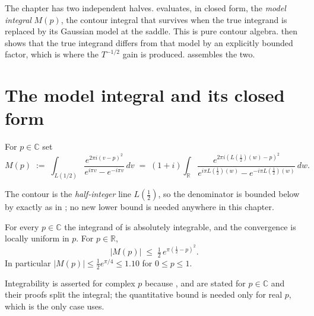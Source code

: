 The chapter has two independent halves.   evaluates, in closed form, the
\emph{model integral} $M(p)$, the contour integral that survives when the true integrand is
replaced by its Gaussian model at the saddle.  This is pure contour algebra.   then shows
that the true integrand differs from that model by an explicitly bounded factor, which is
where the $T^{-1/2}$ gain is produced.   assembles the two.

\section{The model integral and its closed form}
\label{sec:rsf_model}

\begin{definition}
\label{def:rsf_model}
\leanok
{}
For $p\in\mathbb{C}$ set
\[
  M(p)\;:=\;\int_{L(1/2)}\frac{e^{2\pi i(v-p)^{2}}}{e^{i\pi v}-e^{-i\pi v}}\,dv
  \;=\;(1+i)\int_{\mathbb{R}}
     \frac{e^{2\pi i\left(L(\tfrac12)(w)-p\right)^{2}}}
          {e^{i\pi L(\frac12)(w)}-e^{-i\pi L(\frac12)(w)}}\,dw .
\]
\end{definition}

The contour is the \emph{half-integer} line $L(\tfrac12)$, so the denominator is bounded below
by  exactly as in ; no new lower bound is
needed anywhere in this chapter.

\begin{lemma}
\label{lem:rsf_model_conv}
\leanok
{}
For every $p\in\mathbb{C}$ the integrand of  is absolutely integrable, and
the convergence is locally uniform in $p$.  For $p\in\mathbb{R}$,
\[
  \lvert M(p)\rvert\;\le\;\tfrac12\,e^{\pi\left(\frac12-p\right)^{2}} .
\]
In particular $\lvert M(p)\rvert\le\tfrac12e^{\pi/4}\le1.10$ for $0\le p\le1$.
\end{lemma}

Integrability is asserted for complex $p$ because ,
 and  are stated for $p\in\mathbb{C}$ and
their proofs split the integral; the quantitative bound is needed only for real $p$, which is
the only case  uses.

